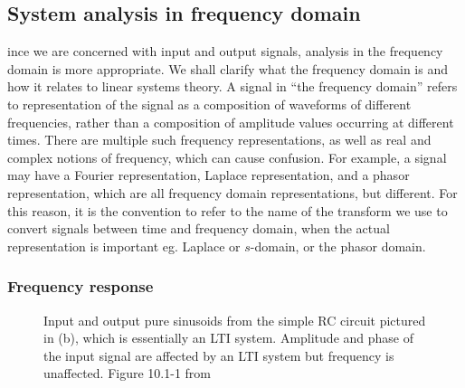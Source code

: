\clearpage
\subsection{System analysis in frequency domain}\label{sec:freq_domain_analysis}
ince we are concerned with input and output signals, analysis in the frequency domain is more appropriate. We shall clarify what the frequency domain is and how it relates to linear systems theory.    A signal in ``the frequency domain'' refers to representation of the signal as a composition of waveforms of different frequencies, rather than a composition of amplitude  values occurring at different times.  There are multiple such frequency representations, as well as real and complex notions of frequency, which can cause confusion.   For example, a signal may have a Fourier representation, Laplace representation, and a phasor representation, which are all frequency domain representations, but different.    For this reason, it is the convention to refer to the name of the transform we use to convert signals between time and frequency domain, when the actual representation is important eg. Laplace or $s$-domain, or the phasor domain. 

\subsubsection{Frequency response}\label{sec:frequency_response}
\begin{figure}[ht]
\centering
{} 
\caption{Input and output pure sinusoids from the simple RC circuit pictured in (b), which is essentially an LTI system.  Amplitude and phase of the input signal are affected by an LTI system but frequency is unaffected. Figure 10.1-1 from \cite{dorf2004introduction}}
\label{fig:IO_sinusoids}
\end{figure}



